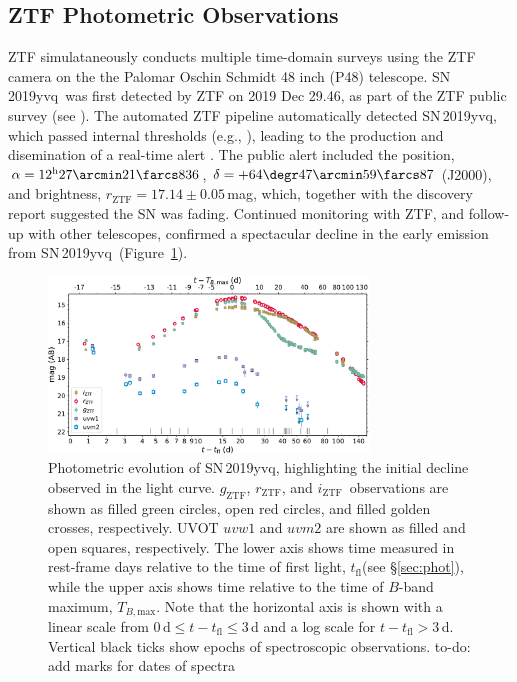 \documentclass[twocolumn]{aastex63}
\newcommand{\todo}[1]{{\color{magenta} to-do: {#1}}}
\newcommand{\rztf}{$r_\mathrm{ZTF}$}
\newcommand{\gztf}{$g_\mathrm{ZTF}$}
\newcommand{\iztf}{$i_\mathrm{ZTF}$}
\newcommand{\tfl}{$t_\mathrm{fl}$}
\newcommand{\tbmax}{$T_{B,\mathrm{max}}$}
\newcommand{\sn}{SN\,2019yvq}
\begin{document}
\subsection{ZTF Photometric Observations}

ZTF simulataneously conducts multiple time-domain surveys using the ZTF
camera on the the Palomar Oschin Schmidt 48 inch (P48) telescope. \sn\ was
first detected by ZTF on 2019 Dec 29.46, as part of the ZTF public survey
(see \citealt{Bellm19a}). The automated ZTF pipeline \citep{Masci19}
automatically detected \sn, which passed internal thresholds (e.g.,
\citealt{Mahabal19}), leading to the production and disemination of a
real-time alert \citep{Patterson19}. The public alert included the position,
$\alpha = 12^{\mathrm{h}}27\arcmin21\farcs836$, $\delta =
+64\degr47\arcmin59\farcs87$ (J2000), and brightness, \rztf$ =
17.14\pm0.05$\,mag, which, together with the \citet{Itagaki19} discovery
report suggested the SN was fading. Continued monitoring with ZTF, and
follow-up with other telescopes, confirmed a spectacular decline in the early
emission from \sn\ (Figure~\ref{fig:p48}).

\begin{figure}
    \centering
    \includegraphics[width=3.35in]{./figures/P48_lc.pdf}
    \caption{Photometric evolution of \sn, highlighting the initial decline
    observed in the light curve. \gztf, \rztf, and \iztf\ observations are
    shown as filled green circles, open red circles, and filled golden
    crosses, respectively. UVOT $uvw1$ and $uvm2$ are shown as filled and
    open squares, respectively. The lower axis shows time measured in
    rest-frame days relative to the time of first light, \tfl (see
    \S\ref{sec:phot}), while the upper axis shows time relative to the time
    of $B$-band maximum, \tbmax. Note that the horizontal axis is shown with
    a linear scale from $0\,\mathrm{d} \le t - t_\mathrm{fl} \le 3$\,d and a
    log scale for $t - t_\mathrm{fl} > 3$\,d. Vertical black ticks show
    epochs of spectroscopic observations. \todo{add marks for dates of
    spectra}}
    \label{fig:p48}
\end{figure}
\end{document}
